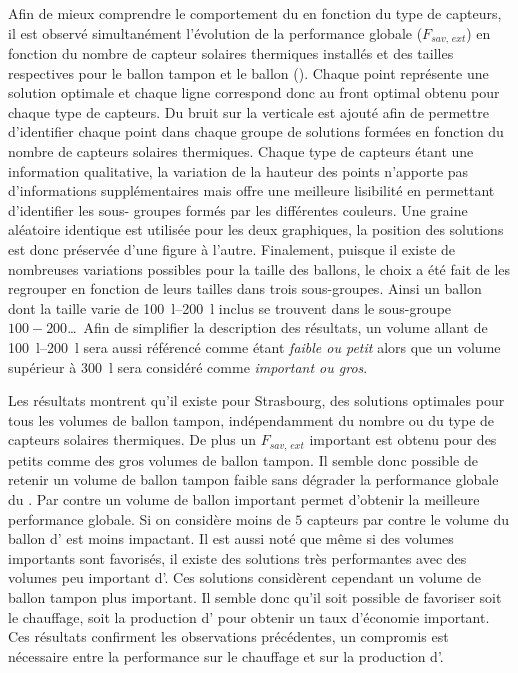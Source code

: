 Afin de mieux comprendre le comportement du  en fonction du type de capteurs, il
est observé simultanément l’évolution de la performance globale ($F_{sav,\, ext}$) en
fonction du nombre de capteur solaires thermiques installés et des tailles respectives
pour le ballon tampon et le ballon  ().
Chaque point représente une solution optimale et chaque ligne correspond donc au front
optimal obtenu pour chaque type de capteurs. Du bruit sur la verticale est ajouté afin de
permettre d’identifier chaque point dans chaque groupe de solutions formées en fonction du
nombre de capteurs solaires thermiques. Chaque type de capteurs étant une information
qualitative, la variation de la hauteur des points n’apporte pas d’informations
supplémentaires mais offre une meilleure lisibilité en permettant d’identifier les sous-
groupes formés par les différentes couleurs. Une graine aléatoire identique est utilisée
pour les deux graphiques, la position des solutions est donc préservée d’une figure à
l’autre. Finalement, puisque il existe de nombreuses variations possibles pour la taille
des ballons, le choix a été fait de les regrouper en fonction de leurs tailles dans trois
sous-groupes. Ainsi un ballon dont la taille varie de \SIrange{100}{200}{\litre} inclus se
trouvent dans le sous-groupe $100-200$\dots\ Afin de simplifier la description des résultats,
un volume allant de \SIrange{100}{200}{\litre} sera aussi référencé comme étant
\emph{faible ou petit} alors que un volume supérieur à \SI{300}{\litre} sera considéré
comme \emph{important ou gros}.

Les résultats montrent qu’il existe pour Strasbourg, des solutions optimales pour tous les volumes de
ballon tampon, indépendamment du nombre ou du type de capteurs solaires thermiques. De
plus un $F_{sav,\, ext}$ important est obtenu pour des petits comme des gros volumes de
ballon tampon. Il semble donc possible de retenir un volume de ballon tampon faible sans
dégrader la performance globale du . Par contre un volume de ballon 
important permet d’obtenir la meilleure performance globale. Si on considère moins de $5$
capteurs par contre le volume du ballon d’ est moins impactant. Il est aussi noté
que même si des volumes importants sont favorisés, il existe des solutions très
performantes avec des volumes peu important d’. Ces solutions considèrent
cependant un volume de ballon tampon plus important. Il semble donc qu’il soit possible de
favoriser soit le chauffage, soit la production d’ pour obtenir un taux
d’économie important. Ces résultats confirment les observations précédentes, un compromis
est nécessaire entre la performance sur le chauffage et sur la production d’.

